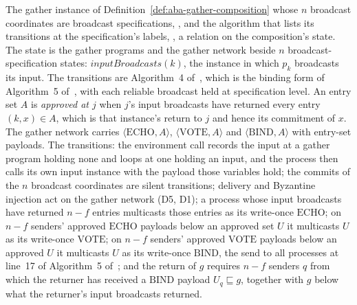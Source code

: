 \begin{definition}
  \label{def:aba-gather-over-broadcast-specification}
  \leanok
  The gather instance of Definition~\ref{def:aba-gather-composition} whose $n$ broadcast coordinates are broadcast specifications, , and the algorithm that lists its transitions at the specification's labels, , a relation on the composition's state.
  The state is the gather programs and the gather network beside $n$ broadcast-specification states: $\mathit{inputBroadcasts}(k)$, the instance in which $p_k$ broadcasts its input.
  The transitions are Algorithm~4 of~\cite{LeslieBP}, which is the binding form of Algorithm~5 of~\cite{AFW25}, with each reliable broadcast held at specification level.
  An entry set $A$ is \emph{approved at $j$} when $j$'s input broadcasts have returned every entry $(k, x) \in A$, which is that instance's return to $j$ and hence its commitment of $x$.
  The gather network carries $\langle\mathrm{ECHO}, A\rangle$, $\langle\mathrm{VOTE}, A\rangle$ and $\langle\mathrm{BIND}, A\rangle$ with entry-set payloads.
  The transitions: the environment call records the input at a gather program holding none and loops at one holding an input, and the process then calls its own input instance with the payload those variables hold; the commits of the $n$ broadcast coordinates are silent transitions; delivery and Byzantine injection act on the gather network (D5, D1); a process whose input broadcasts have returned $n{-}f$ entries multicasts those entries as its write-once $\mathrm{ECHO}$; on $n{-}f$ senders' approved $\mathrm{ECHO}$ payloads below an approved set $U$ it multicasts $U$ as its write-once $\mathrm{VOTE}$; on $n{-}f$ senders' approved $\mathrm{VOTE}$ payloads below an approved $U$ it multicasts $U$ as its write-once $\mathrm{BIND}$, the send to all processes at line~17 of Algorithm~5 of~\cite{AFW25}; and the return of $g$ requires $n{-}f$ senders $q$ from which the returner has received a $\mathrm{BIND}$ payload $U_q \sqsubseteq g$, together with $g$ below what the returner's input broadcasts returned.

\end{definition}
